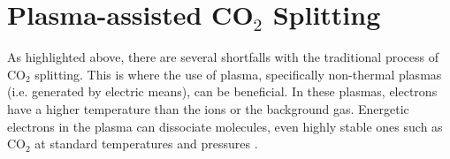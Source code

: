 %




%
%
%
%

\newpage
\section{Plasma-assisted CO$_2$ Splitting}

As highlighted above, there are several shortfalls with the traditional process of CO$_2$ splitting. This is where the use of plasma, specifically non-thermal plasmas (i.e. generated by electric means), can be beneficial. In these plasmas,  electrons have a higher temperature than the ions or the background gas. Energetic electrons in the plasma can dissociate molecules, even highly stable ones such as CO$_2$ at standard temperatures and pressures \cite{Snoeckx2017}. 

